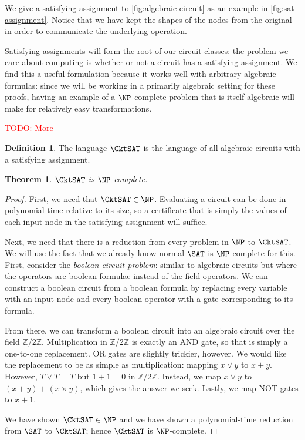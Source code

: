 \documentclass[english,12pt]{reedthesis}
\theoremstyle{plain}
\newtheorem{thm}{Theorem}[section]
\theoremstyle{definition}
\newtheorem{defn}[defn]{Definition}
\theoremstyle{remark}
\newcommand{\TODO}[1]{\textcolor{red}{TODO: #1}}
\begin{document}
We give a satisfying assignment to \cref{fig:algebraic-circuit} as an example in
\cref{fig:sat-assignment}. Notice that we have kept the shapes of the nodes from
the original in order to communicate the underlying operation.

Satisfying assignments will form the root of our circuit classes: the problem we
care about computing is whether or not a circuit has a satisfying assignment.
We find this a useful formulation because it works well with arbitrary algebraic
formulas: since we will be working in a primarily algebraic setting for these
proofs, having an example of a $\NP$-complete problem that is itself algebraic
will make for relatively easy transformations.

\TODO{More}

\begin{defn}\label{def:cktsat}
  The language $\CktSAT$ is the language of all algebraic circuits with a
  satisfying assignment.
\end{defn}

\begin{thm}\label{thm:cktsat-np-complete}
  $\CktSAT$ is $\NP$-complete.
\end{thm}

\begin{proof}
  First, we need that $\CktSAT \in \NP$. Evaluating a circuit can be done in
  polynomial time relative to its size, so a certificate that is simply the
  values of each input node in the satisfying assignment will suffice.

  Next, we need that there is a reduction from every problem in $\NP$ to
  $\CktSAT$. We will use the fact that we already know normal $\SAT$ is
  $\NP$-complete for this. First, consider the \emph{boolean circuit problem}:
  similar to algebraic circuits but where the operators are boolean formulae
  instead of the field operators. We can construct a boolean circuit from a
  boolean formula by replacing every variable with an input node and every
  boolean operator with a gate corresponding to its formula.

  From there, we can transform a boolean circuit into an algebraic circuit over
  the field $\mathbb{Z}/2\mathbb{Z}$. Multiplication in $\mathbb{Z}/2\mathbb{Z}$ is exactly an AND gate, so that is
  simply a one-to-one replacement. OR gates are slightly trickier, however. We
  would like the replacement to be as simple as multiplication: mapping $x \vee y$
  to $x + y$. However, $T \vee T = T$ but $1 + 1 = 0$ in $\mathbb{Z}/2\mathbb{Z}$. Instead, we map
  $x \vee y$ to $(x + y) + (x \times y)$, which gives the answer we seek. Lastly, we map
  NOT gates to $x + 1$.

  We have shown $\CktSAT \in \NP$ and we have shown a polynomial-time reduction
  from $\SAT$ to $\CktSAT$; hence $\CktSAT$ is $\NP$-complete.
\end{proof}
\end{document}
